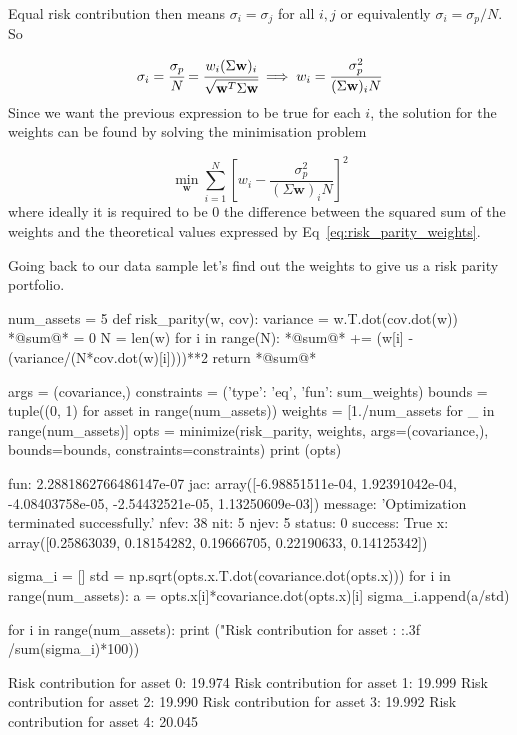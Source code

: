 Equal risk contribution then means \(\sigma _{i} =\sigma _{j}\) for all \(i,j\) or equivalently \(\sigma _{i}=\sigma_p/N\). So

\begin{equation}
\sigma _{i} = \cfrac{\sigma_p}{N}={\cfrac {w_{i}(\Sigma \mathbf{w})_{i}}{\sqrt {\mathbf{w}^T\Sigma \mathbf{w}}}}\implies w_{i} = \frac {\sigma_p^{2}}{(\Sigma \mathbf{w})_{i}N}
\label{eq:risk_parity_weights}
\end{equation}
Since we want the previous expression to be true for each $i$, the solution for the weights can be found by solving the minimisation problem

\begin{equation} 
\underset{\mathbf{w}}{\min } \sum _{i=1}^{N}\left[w_{i}-{\frac {\sigma_p^{2}}{(\Sigma \mathbf{w})_{i}N}}\right]^{2} 
\end{equation}
\noindent
where ideally it is required to be 0 the difference between the squared sum of the weights and the theoretical values expressed by Eq~\ref{eq:risk_parity_weights}.

Going back to our data sample let's find out the weights to give us a risk parity portfolio.

\begin{ipython}
num_assets = 5
def risk_parity(w, cov):
    variance = w.T.dot(cov.dot(w))
    *@sum@* = 0
    N = len(w)
    for i in range(N):
        *@sum@* += (w[i] - (variance/(N*cov.dot(w)[i])))**2
    return *@sum@*
	
args = (covariance,)
constraints = ({'type': 'eq', 'fun': sum_weights})
bounds = tuple((0, 1) for asset in range(num_assets))
weights = [1./num_assets for _ in range(num_assets)]
opts = minimize(risk_parity, weights, args=(covariance,),
                bounds=bounds, constraints=constraints)
print (opts)
\end{ipython}
\begin{ioutput}
    fun: 2.2881862766486147e-07
    jac: array([-6.98851511e-04,  1.92391042e-04, -4.08403758e-05, 
                -2.54432521e-05,  1.13250609e-03])
message: 'Optimization terminated successfully.'
   nfev: 38
    nit: 5
   njev: 5
 status: 0
success: True
x: array([0.25863039, 0.18154282, 0.19666705, 0.22190633, 
          0.14125342])
\end{ioutput}

\begin{ipython}
sigma_i = []
std = np.sqrt(opts.x.T.dot(covariance.dot(opts.x)))
for i in range(num_assets):
    a = opts.x[i]*covariance.dot(opts.x)[i]
	sigma_i.append(a/std)
	
for i in range(num_assets):
    print ("Risk contribution for asset {}: {:.3f}%
                                                            /sum(sigma_i)*100))
\end{ipython}
\begin{ioutput}
Risk contribution for asset 0: 19.974%
Risk contribution for asset 1: 19.999%
Risk contribution for asset 2: 19.990%
Risk contribution for asset 3: 19.992%
Risk contribution for asset 4: 20.045%
\end{ioutput}

